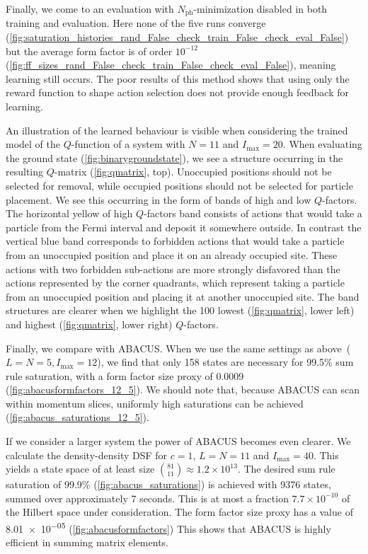 \documentclass[11pt, a4paper]{report} %
\begin{document}
Finally, we come to an evaluation with \(N_{\mathrm{ph}}\)-minimization disabled in both training and evaluation.
Here none of the five runs converge (\cref{fig:saturation_histories_rand_False_check_train_False_check_eval_False}) but the average form factor is of order \(10^{-12}\) (\cref{fig:ff_sizes_rand_False_check_train_False_check_eval_False}), meaning learning still occurs.
The poor results of this method shows that using only the reward function to shape action selection does not provide enough feedback for learning.


An illustration of the learned behaviour is visible when considering the trained model of the \(Q\)-function of a system with \(N=11\) and \(I_{\max}=20\).
When evaluating the ground state (\cref{fig:binarygroundstate}), we see a structure occurring in the resulting \(Q\)-matrix (\cref{fig:qmatrix}, top).
Unoccupied positions should not be selected for removal, while occupied positions should not be selected for particle placement.
We see this occurring in the form of bands of high and low \(Q\)-factors.
The horizontal yellow of high \(Q\)-factors band consists of actions that would take a particle from the Fermi interval and deposit it somewhere outside.
In contrast the vertical blue band corresponds to forbidden actions that would take a particle from an unoccupied position and place it on an already occupied site.
These actions with two forbidden sub-actions are more strongly disfavored than the actions represented by the corner quadrants, which represent taking a particle from an unoccupied position and placing it at another unoccupied site.
The band structures are clearer when we highlight the 100 lowest (\cref{fig:qmatrix}, lower left) and highest (\cref{fig:qmatrix}, lower right) \(Q\)-factors.

\begin{sloppypar}
Finally, we compare with ABACUS.\@
When we use the same settings as above~(\(L=N=5, I_{\max}=12\)), we find that only 158 states are necessary for 99.5\% sum rule saturation, with a form factor size proxy of 0.0009 (\cref{fig:abacusformfactors_12_5}).
We should note that, because ABACUS can scan within momentum slices, uniformly high saturations can be achieved (\cref{fig:abacus_saturations_12_5}).
\end{sloppypar}

If we consider a larger system the power of ABACUS becomes even clearer.
We calculate the density-density DSF for \(c=1\), \(L=N=11\) and \(I_{\max}=40\).
This yields a state space of at least size \(\binom{81}{11}\approx 1.2\times 10^{13}\).
The desired sum rule saturation of 99.9\% (\cref{fig:abacus_saturations}) is achieved with 9376 states, summed over approximately 7 seconds.
This is at most a fraction \(7.7\times 10^{-10}\) of the Hilbert space under consideration.
The form factor size proxy has a value of \num{8.01e-05} (\cref{fig:abacusformfactors})
This shows that ABACUS is highly efficient in summing matrix elements.
\end{document}
